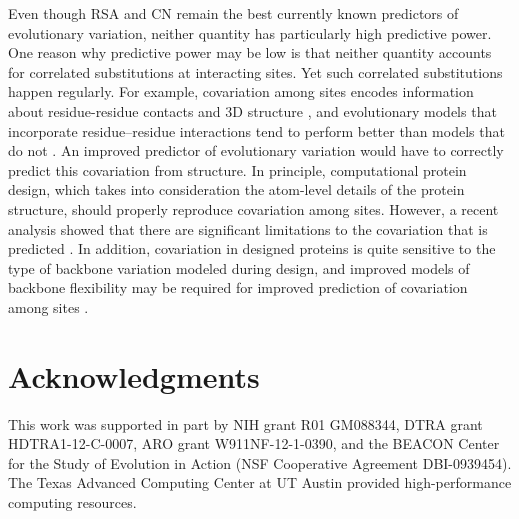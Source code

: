 \documentclass[smallextended]{svjour3}
\begin{document}
Even though RSA and CN remain the best currently known predictors of evolutionary variation, neither quantity has particularly high predictive power. One reason why predictive power may be low is that neither quantity accounts for correlated substitutions at interacting sites.  Yet such correlated substitutions happen regularly. For example, covariation among sites encodes information about residue-residue contacts and 3D structure \citep{Halabietal2009,BurgervanNimwegen2010,Marksetal2011,Jonesetal2014}, and evolutionary models that incorporate residue--residue interactions tend to perform better than models that do not \citep{Rodrigueetal2005,BordnerMittelmann2014}. An improved predictor of evolutionary variation would have to correctly predict this covariation from structure. In principle, computational protein design, which takes into consideration the atom-level details of the protein structure, should properly reproduce covariation among sites. However, a recent analysis showed that there are significant limitations to the covariation that is predicted \citep{OllikainenKortemme2013}. In addition, covariation in designed proteins is quite sensitive to the type of backbone variation modeled during design, and improved models of backbone flexibility may be required for improved prediction of covariation among sites \citep{OllikainenKortemme2013}.

\section*{Acknowledgments}

This work was supported in part by NIH grant R01 GM088344, DTRA grant HDTRA1-12-C-0007, ARO grant W911NF-12-1-0390, and the BEACON Center for the Study of Evolution in Action (NSF Cooperative Agreement DBI-0939454). The Texas Advanced Computing Center at UT Austin provided high-performance computing resources.

\end{document}
